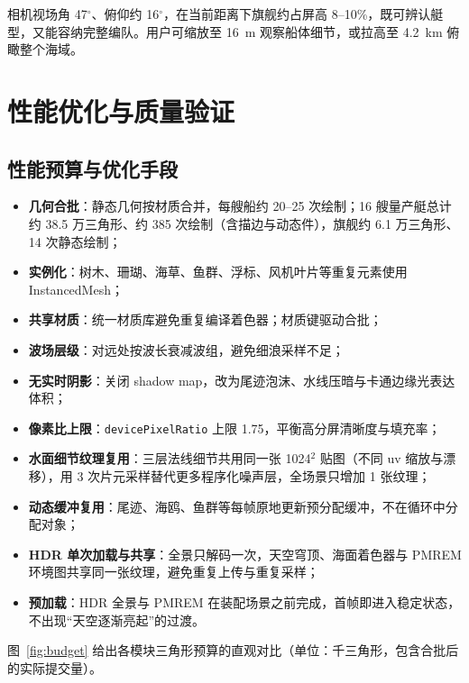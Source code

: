 \documentclass[UTF8, a4paper, 11pt]{ctexart}
\begin{document}
相机视场角 47$^\circ$、俯仰约 16$^\circ$，在当前距离下旗舰约占屏高 8--10\%，既可辨认艇型，又能容纳完整编队。用户可缩放至 16~m 观察船体细节，或拉高至 4.2~km 俯瞰整个海域。

\section{性能优化与质量验证}

\subsection{性能预算与优化手段}

\begin{itemize}
  \item \textbf{几何合批}：静态几何按材质合并，每艘船约 20--25 次绘制；16 艘量产艇总计约 38.5 万三角形、约 385 次绘制（含描边与动态件），旗舰约 6.1 万三角形、14 次静态绘制；
  \item \textbf{实例化}：树木、珊瑚、海草、鱼群、浮标、风机叶片等重复元素使用 InstancedMesh；
  \item \textbf{共享材质}：统一材质库避免重复编译着色器；材质键驱动合批；
  \item \textbf{波场层级}：对远处按波长衰减波组，避免细浪采样不足；
  \item \textbf{无实时阴影}：关闭 shadow map，改为尾迹泡沫、水线压暗与卡通边缘光表达体积；
  \item \textbf{像素比上限}：\texttt{devicePixelRatio} 上限 1.75，平衡高分屏清晰度与填充率；
  \item \textbf{水面细节纹理复用}：三层法线细节共用同一张 1024$^2$ 贴图（不同 uv 缩放与漂移），用 3 次片元采样替代更多程序化噪声层，全场景只增加 1 张纹理；
  \item \textbf{动态缓冲复用}：尾迹、海鸥、鱼群等每帧原地更新预分配缓冲，不在循环中分配对象；
  \item \textbf{HDR 单次加载与共享}：全景只解码一次，天空穹顶、海面着色器与 PMREM 环境图共享同一张纹理，避免重复上传与重复采样；
  \item \textbf{预加载}：HDR 全景与 PMREM 在装配场景之前完成，首帧即进入稳定状态，不出现“天空逐渐亮起”的过渡。
\end{itemize}

图~\ref{fig:budget} 给出各模块三角形预算的直观对比（单位：千三角形，包含合批后的实际提交量）。
\end{document}
